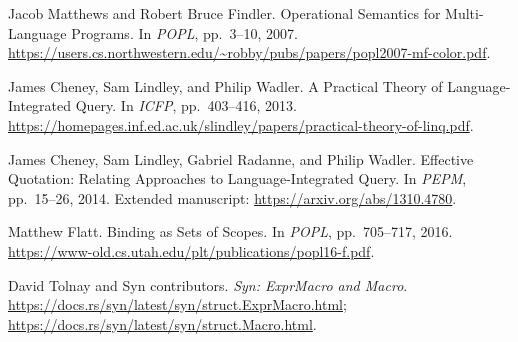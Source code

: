 Jacob Matthews and Robert Bruce Findler.
Operational Semantics for Multi-Language Programs.
In \emph{POPL}, pp.~3--10, 2007.
\url{https://users.cs.northwestern.edu/~robby/pubs/papers/popl2007-mf-color.pdf}.

James Cheney, Sam Lindley, and Philip Wadler.
A Practical Theory of Language-Integrated Query.
In \emph{ICFP}, pp.~403--416, 2013.
\url{https://homepages.inf.ed.ac.uk/slindley/papers/practical-theory-of-linq.pdf}.

James Cheney, Sam Lindley, Gabriel Radanne, and Philip Wadler.
Effective Quotation: Relating Approaches to Language-Integrated Query.
In \emph{PEPM}, pp.~15--26, 2014. Extended manuscript:
\url{https://arxiv.org/abs/1310.4780}.

Matthew Flatt. Binding as Sets of Scopes.
In \emph{POPL}, pp.~705--717, 2016.
\url{https://www-old.cs.utah.edu/plt/publications/popl16-f.pdf}.

David Tolnay and Syn contributors. \emph{Syn: ExprMacro and Macro}.
\url{https://docs.rs/syn/latest/syn/struct.ExprMacro.html};
\url{https://docs.rs/syn/latest/syn/struct.Macro.html}.
